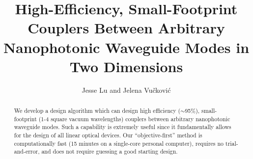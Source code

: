 \documentclass[letterpaper,10pt]{article}
\begin{document}
\title{High-Efficiency, Small-Footprint Couplers Between 
    Arbitrary Nanophotonic Waveguide Modes in Two Dimensions}
\author{Jesse Lu and Jelena Vu\v{c}kovi\'{c}}
\address{Stanford University, Stanford, California, USA.}

\maketitle
\begin{abstract}
We develop a design algorithm which can design 
    high efficiency ($\sim$95\%), 
    small-footprint (1-4 square vacuum wavelengths)
    couplers between arbitrary nanophotonic waveguide modes.
Such a capability is extremely useful since it fundamentally allows for the
    design of all linear optical devices.
Our ``objective-first'' method is
    computationally fast (15 minutes on a single-core personal computer), 
    requires no trial-and-error, and
    does not require guessing a good starting design.
\end{abstract}
\end{document}
